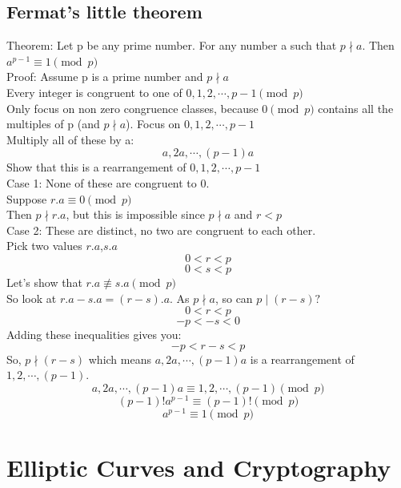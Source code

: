 \documentclass[12pt,a4paper]{report}
\begin{document}
\section{Fermat’s little theorem}
Theorem: Let p be any prime number. For any number a such that $p\nmid a$. Then  
$a^{p-1}\equiv 1\pmod p$\\
Proof: Assume p is a prime number and $p \nmid a$ \\
Every integer is congruent to one of $0,1,2,\cdots,p-1\pmod p$\\
Only focus on non zero congruence classes, because $0 \pmod p$ contains all the multiples of p (and $p \nmid a$).
Focus on $0,1,2,\cdots,p-1$\\
Multiply all of these by a:
$$a,2a,\cdots,(p-1)a$$
Show that this is a rearrangement of $0,1,2,\cdots,p-1$\\
Case 1: None of these are congruent to 0.\\
Suppose $r.a\equiv 0 \pmod p$\\
Then $p\nmid r.a$, but this is impossible since $p\nmid a$ and $r<p$\\
Case 2: These are distinct, no two are congruent to each other.\\
Pick two values $r.a$,$s.a$\\
$$0<r<p$$
$$0<s<p$$
Let's show that $r.a \not\equiv s.a \pmod p$\\
So look at $r.a-s.a=(r-s).a$. As $p\nmid a$, so can $p \mid (r-s)?$\\
$$0<r<p$$
$$-p<-s<0$$
Adding these inequalities gives you:
$$-p<r-s<p$$ 
So, $p\nmid(r-s)$ which means $a,2a,\cdots,(p-1)a$ is a rearrangement of\\ $1,2,\cdots,(p-1).$
$$a,2a,\cdots,(p-1)a\equiv 1,2,\cdots,(p-1) \pmod p$$
$$(p-1)!a^{p-1}\equiv (p-1)! \pmod p$$
$$a^{p-1}\equiv 1 \pmod p$$
		
	
	
\cleardoublepage	

\chapter{Elliptic Curves and Cryptography}
\end{document}
